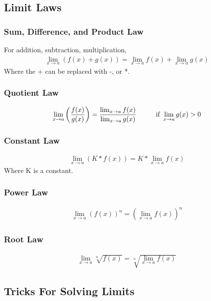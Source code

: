 \documentclass{article}
\newcommand\tab[1][1cm]{\hspace*{#1}}
\newcommand\limxa{\lim_{x\to a}}
\begin{document}
    \subsection{Limit Laws}
        \subsubsection{Sum, Difference, and Product Law}
            For addition, subtraction, multiplication,
            \begin{gather*}
                \limxa (f(x)+g(x)) = \limxa f(x) + \limxa g(x)
            \end{gather*}
            Where the + can be replaced with -, or *.
        \subsubsection{Quotient Law}
            \begin{gather*}
                \limxa\left(\frac{f(x)}{g(x)}\right) = \frac{\limxa f(x)}{\limxa g(x)} \text{\tab if }\limxa g(x) > 0
            \end{gather*}
        \subsubsection{Constant Law}
            \begin{gather*}
                \limxa(K * f(x)) = K * \limxa f(x)
            \end{gather*}
            Where K is a constant.
        \subsubsection{Power Law}
            \begin{gather*}
                \limxa(f(x))^n = (\limxa f(x))^n
            \end{gather*}
        \subsubsection{Root Law}
            \begin{gather*}
                \limxa\sqrt[n]{f(x)} = \sqrt[n]{\limxa f(x)}
            \end{gather*}
    \subsection{Tricks For Solving Limits}
\end{document}
